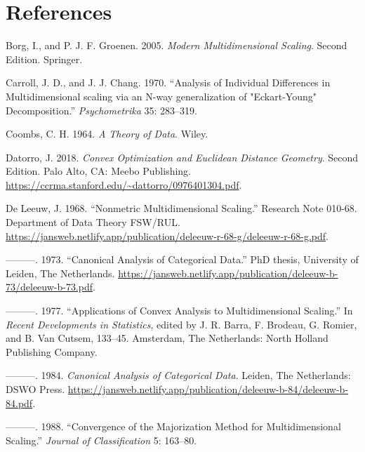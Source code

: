 \documentclass[
  12pt,
  letterpaper,
  DIV=11,
  numbers=noendperiod]{scrartcl}
\newlength{\cslhangindent}
\newenvironment{CSLReferences}[2] %
 {\begin{list}{}{%
  \setlength{\itemindent}{0pt}
  \setlength{\leftmargin}{0pt}
  \setlength{\parsep}{0pt}
  \ifodd #1
   \setlength{\leftmargin}{\cslhangindent}
   \setlength{\itemindent}{-1\cslhangindent}
  \fi
  \setlength{\itemsep}{#2\baselineskip}}}
 {\end{list}}
\newcommand{\sectionbreak}{\clearpage}
\begin{document}
\sectionbreak

\section*{References}\label{references}

\label{refs}
\begin{CSLReferences}{1}{0}
Borg, I., and P. J. F. Groenen. 2005. \emph{Modern Multidimensional
Scaling}. Second Edition. Springer.

Carroll, J. D., and J. J. Chang. 1970. {``{Analysis of Individual
Differences in Multidimensional scaling via an N-way generalization of
"Eckart-Young" Decomposition.}''} \emph{Psychometrika} 35: 283--319.

Coombs, C. H. 1964. \emph{{A Theory of Data}}. Wiley.

Datorro, J. 2018. \emph{Convex Optimization and Euclidean Distance
Geometry}. Second Edition. Palo Alto, CA: Meebo Publishing.
\url{https://ccrma.stanford.edu/~dattorro/0976401304.pdf}.

De Leeuw, J. 1968. {``Nonmetric Multidimensional Scaling.''} Research
Note 010-68. Department of Data Theory FSW/RUL.
\url{https://jansweb.netlify.app/publication/deleeuw-r-68-g/deleeuw-r-68-g.pdf}.

---------. 1973. {``Canonical Analysis of Categorical Data.''} PhD
thesis, University of Leiden, The Netherlands.
\url{https://jansweb.netlify.app/publication/deleeuw-b-73/deleeuw-b-73.pdf}.

---------. 1977. {``Applications of Convex Analysis to Multidimensional
Scaling.''} In \emph{Recent Developments in Statistics}, edited by J. R.
Barra, F. Brodeau, G. Romier, and B. Van Cutsem, 133--45. Amsterdam, The
Netherlands: North Holland Publishing Company.

---------. 1984. \emph{Canonical Analysis of Categorical Data}. Leiden,
The Netherlands: DSWO Press.
\url{https://jansweb.netlify.app/publication/deleeuw-b-84/deleeuw-b-84.pdf}.

---------. 1988. {``Convergence of the Majorization Method for
Multidimensional Scaling.''} \emph{Journal of Classification} 5:
163--80.


\end{CSLReferences}
\end{document}

